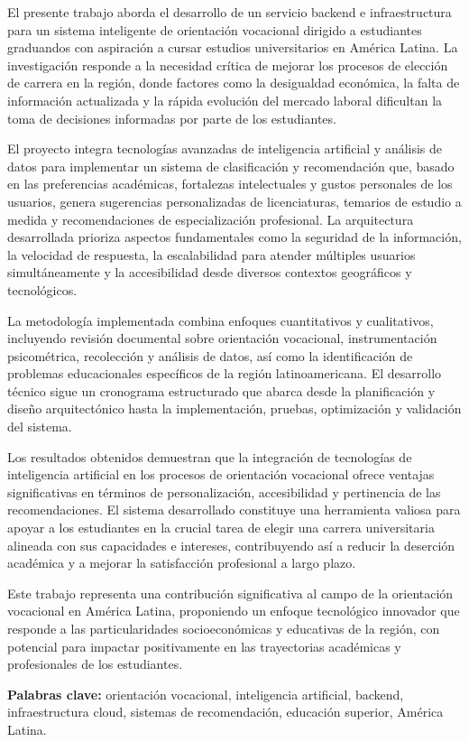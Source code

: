 El presente trabajo aborda el desarrollo de un servicio backend e infraestructura para un sistema inteligente de orientación vocacional dirigido a estudiantes graduandos con aspiración a cursar estudios universitarios en América Latina. La investigación responde a la necesidad crítica de mejorar los procesos de elección de carrera en la región, donde factores como la desigualdad económica, la falta de información actualizada y la rápida evolución del mercado laboral dificultan la toma de decisiones informadas por parte de los estudiantes.

El proyecto integra tecnologías avanzadas de inteligencia artificial y análisis de datos para implementar un sistema de clasificación y recomendación que, basado en las preferencias académicas, fortalezas intelectuales y gustos personales de los usuarios, genera sugerencias personalizadas de licenciaturas, temarios de estudio a medida y recomendaciones de especialización profesional. La arquitectura desarrollada prioriza aspectos fundamentales como la seguridad de la información, la velocidad de respuesta, la escalabilidad para atender múltiples usuarios simultáneamente y la accesibilidad desde diversos contextos geográficos y tecnológicos.

La metodología implementada combina enfoques cuantitativos y cualitativos, incluyendo revisión documental sobre orientación vocacional, instrumentación psicométrica, recolección y análisis de datos, así como la identificación de problemas educacionales específicos de la región latinoamericana. El desarrollo técnico sigue un cronograma estructurado que abarca desde la planificación y diseño arquitectónico hasta la implementación, pruebas, optimización y validación del sistema.

Los resultados obtenidos demuestran que la integración de tecnologías de inteligencia artificial en los procesos de orientación vocacional ofrece ventajas significativas en términos de personalización, accesibilidad y pertinencia de las recomendaciones. El sistema desarrollado constituye una herramienta valiosa para apoyar a los estudiantes en la crucial tarea de elegir una carrera universitaria alineada con sus capacidades e intereses, contribuyendo así a reducir la deserción académica y a mejorar la satisfacción profesional a largo plazo.

Este trabajo representa una contribución significativa al campo de la orientación vocacional en América Latina, proponiendo un enfoque tecnológico innovador que responde a las particularidades socioeconómicas y educativas de la región, con potencial para impactar positivamente en las trayectorias académicas y profesionales de los estudiantes.

\textbf{Palabras clave:} orientación vocacional, inteligencia artificial, backend, infraestructura cloud, sistemas de recomendación, educación superior, América Latina.


